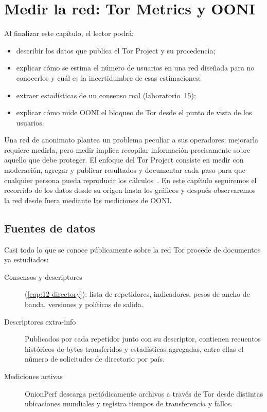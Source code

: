 \chapter{Medir la red: Tor Metrics y OONI}\label{cap:24-metrics}

\begin{obiettivi}
Al finalizar este capítulo, el lector podrá:
\begin{itemize}[nosep]
  \item describir los datos que publica el Tor Project y su procedencia;
  \item explicar cómo se estima el número de usuarios en una red diseñada para no conocerlos y cuál es la incertidumbre de esas estimaciones;
  \item extraer estadísticas de un consenso real (laboratorio~15);
  \item explicar cómo mide OONI el bloqueo de Tor desde el punto de vista de los usuarios.
\end{itemize}
\end{obiettivi}

Una red de anonimato plantea un problema peculiar a sus operadores: mejorarla requiere medirla, pero medir implica recopilar información precisamente sobre aquello que debe proteger. El enfoque del Tor Project consiste en medir con moderación, agregar y publicar resultados y documentar cada paso para que cualquier persona pueda reproducir los cálculos~\cite{metricsreproducible}. En este capítulo seguiremos el recorrido de los datos desde su origen hasta los gráficos y después observaremos la red desde fuera mediante las mediciones de OONI.

\section{Fuentes de datos}\label{sec:metrics-fonti}

Casi todo lo que se conoce públicamente sobre la red Tor procede de documentos ya estudiados:
\begin{description}
  \item[Consensos y descriptores] (\cref{cap:12-directory}): lista de repetidores, indicadores, pesos de ancho de banda, versiones y políticas de salida.
  \item[Descriptores extra-info] Publicados por cada repetidor junto con su descriptor, contienen recuentos históricos de bytes transferidos y estadísticas agregadas, entre ellas el número de solicitudes de directorio por país.
  \item[Mediciones activas] OnionPerf descarga periódicamente archivos a través de Tor desde distintas ubicaciones mundiales y registra tiempos de transferencia y fallos.
\end{description}

